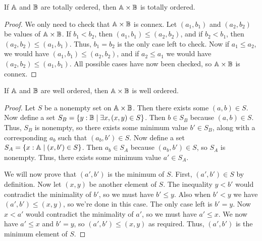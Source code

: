 \documentclass[../math.tex]{subfiles}
\begin{document}
\begin{theorem}
    If $\mathbb{A}$ and $\mathbb{B}$ are totally ordered, then $\mathbb{A} \times \mathbb{B}$ is totally
    ordered.
\end{theorem}
\begin{proof}
    We only need to check that $\mathbb{A} \times \mathbb{B}$ is connex.  Let $(a_1, b_1)$ and
    $(a_2, b_2)$ be values of $\mathbb{A} \times \mathbb{B}$.  If $b_1 < b_2$, then $(a_1, b_1)
    \leq (a_2, b_2)$, and if $b_2 < b_1$, then $(a_2, b_2) \leq (a_1, b_1)$.
    Thus, $b_1 = b_2$ is the only case left to check.  Now if $a_1 \leq a_2$, we
    would have $(a_1, b_1) \leq (a_2, b_2)$, and if $a_2 \leq a_1$ we would have
    $(a_2, b_2) \leq (a_1, b_1)$.  All possible cases have now been checked, so
    $\mathbb{A} \times \mathbb{B}$ is connex.
\end{proof}

\begin{theorem}
    If $\mathbb{A}$ and $\mathbb{B}$ are well ordered, then $\mathbb{A} \times \mathbb{B}$ is well ordered.
\end{theorem}
\begin{proof}
    Let $S$ be a nonempty set on $\mathbb{A} \times \mathbb{B}$.  Then there exists some $(a, b)
    \in S$.  Now define a set $S_B = \{y : \mathbb{B} \mid \exists x, (x, y) \in
    S\}$.  Then $b \in S_B$ because $(a, b) \in S$.  Thus, $S_B$ is nonempty, so
    there exists some minimum value $b' \in S_B$, along with a corresponding
    $a_b$ such that $(a_b, b') \in S$.  Now define a set $S_A = \{x : \mathbb{A} \mid
    (x, b') \in S\}$.  Then $a_b \in S_A$ because $(a_b, b') \in S$, so $S_A$ is
    nonempty.  Thus, there exists some minimum value $a' \in S_A$.

    We will now prove that $(a', b')$ is the minimum of $S$.  First, $(a', b')
    \in S$ by definition.  Now let $(x, y)$ be another element of $S$.  The
    inequality $y < b'$ would contradict the minimality of $b'$, so we must have
    $b' \leq y$.  Also when $b' < y$ we have $(a', b') \leq (x, y)$, so we're
    done in this case.  The only case left is $b' = y$.  Now $x < a'$ would
    contradict the minimality of $a'$, so we must have $a' \leq x$.  We now have
    $a' \leq x$ and $b' = y$, so $(a', b') \leq (x, y)$ as required.  Thus,
    $(a', b')$ is the minimum element of $S$.
\end{proof}
\end{document}
